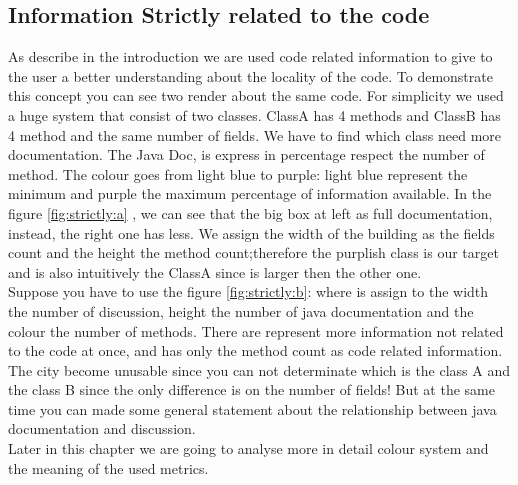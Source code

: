 \documentclass[]{usiinfbachelorproject}
\begin{document}
\subsection{Information Strictly related to the code}
As describe in the introduction we are used code related information to give to the user a better understanding about the locality of the code. To demonstrate this concept you can see two render about the same code. For simplicity we used a huge system that consist of two classes. ClassA has 4 methods and ClassB has 4 method and the same number of fields. We have to find which class need more documentation. The Java Doc, is express in percentage respect the number of method. The colour goes from light blue to purple: light blue represent the minimum and purple the maximum percentage of information available. In the figure \ref{fig:strictly:a} , we can see that the big box at left as full documentation, instead, the right one has less. We assign the width of the building as the fields count and the height the method count;therefore the purplish class is our target and is also intuitively the ClassA since is larger then the other one. \\
Suppose you have to use the figure \ref{fig:strictly:b}: where is assign to the width the number of discussion, height the number of java documentation and the colour the number of methods. There are represent  more information not related to the code at once, and has only the method count as code related information. The city become unusable since you can not determinate which is the class A and the class B since the only difference is on the number of fields! But at the same time you can made some general statement about the relationship between java documentation and discussion.\\
 Later in this chapter we are going to analyse more in detail colour system and the meaning of the used metrics.
\end{document}
